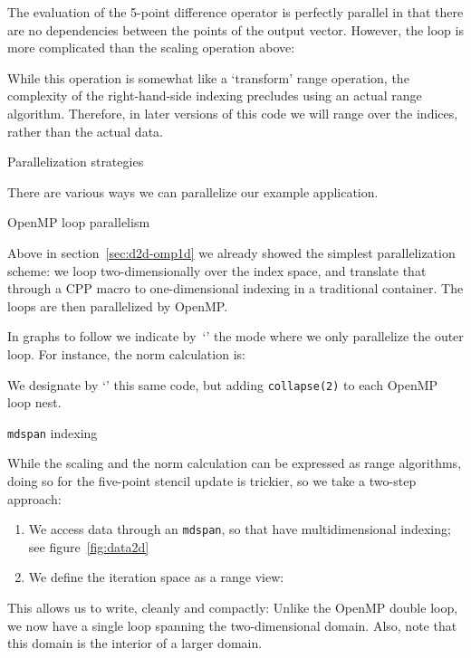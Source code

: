 The evaluation of the 5-point difference operator is perfectly parallel
in that there are no dependencies between the points of the output vector.
However, the loop is more complicated than the scaling operation above:
%

While this operation is somewhat like a `transform' range operation,
the complexity of the right-hand-side indexing precludes using
an actual range algorithm.
Therefore, in later versions of this code we will range over
the indices, rather than the actual data.


 {Parallelization strategies}

There are various ways we can parallelize our example application.

 {OpenMP loop parallelism}

Above in section~\ref{sec:d2d-omp1d}
we already showed the simplest parallelization scheme:
we loop two-dimensionally over the index space,
and translate that through a \ac{CPP} macro
to one-dimensional indexing in a traditional container.
The loops are then parallelized by OpenMP.

In graphs to follow we indicate by~`'
the mode where we only parallelize the outer loop.
For instance, the norm calculation is:
%

We designate by `' this same code, but adding
\lstinline{collapse(2)} to each OpenMP loop nest.

 {\texttt{mdspan} indexing}

While the scaling and the norm calculation can be expressed as range algorithms,
doing so for the five-point stencil update is trickier,
so we take a two-step approach:

  
\begin{enumerate}
\item We access data through an \lstinline{mdspan}, so that have multidimensional indexing;
  see figure~\ref{fig:data2d}

\begin{figure*}[h]
  \caption{Use of \texttt{mdspan} for 2D data access}
  \label{fig:data2d}
\end{figure*}

\item We define the iteration space as a  range view:


\end{enumerate}
This allows us to write, cleanly and compactly:
%
%
Unlike the OpenMP double loop, we now have a single loop
spanning the two-dimensional domain.
Also, note that this domain is the interior of a larger domain.

